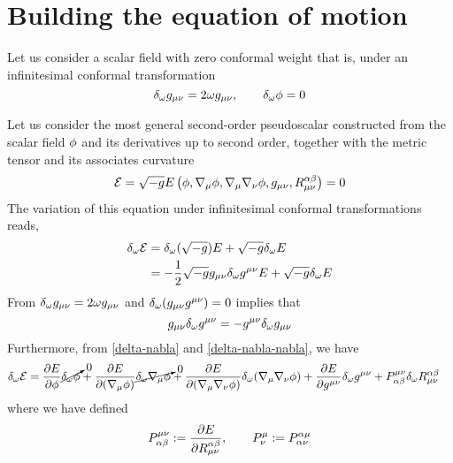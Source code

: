 \section{Building the equation of motion}
Let us consider a scalar field with zero conformal weight that is, under an infinitesimal conformal transformation
\begin{equation}
  \delta_\omega g_{\mu\nu }=2\omega g_{\mu\nu },\qquad \delta_\omega\phi=0
\end{equation}

Let us consider the most general second-order pseudoscalar constructed from the scalar field $\phi$ and its derivatives up to second order, together with the metric tensor and its associates curvature
\begin{equation}
	\mathcal{E} =\sqrt{-g}E\left(\phi,\nabla_\mu \phi ,\nabla_\mu \nabla_\nu \phi ,g_{\mu\nu },R_{\mu\nu }^{\alpha\beta }\right)=0
\end{equation}
The variation of this equation under infinitesimal conformal transformations reads,
\begin{align}
  \delta_\omega \mathcal{E}&=\delta_\omega(\sqrt{-g})E+\sqrt{-g}\delta_\omega E\\
  &=-\frac{1}{2}\sqrt{-g}g_{\mu\nu }\delta_\omega g^{\mu\nu }E+\sqrt{-g}\delta_\omega E
\end{align}
From $\delta_\omega g_{\mu\nu }=2\omega g_{\mu\nu }$ and $\delta_\omega(g_{\mu\nu }g^{\mu\nu })=0$ implies that
\begin{equation}
  g_{\mu\nu }\delta_\omega g^{\mu\nu }=-g^{\mu\nu }\delta_\omega g_{\mu\nu }
\end{equation}
Furthermore, from \eqref{delta-nabla} and \eqref{delta-nabla-nabla}, we have
\begin{align}
  \delta_\omega \mathcal{E}&=\pdv{E}{\phi}\cancelto{0}{\delta_\omega \phi} +\pdv{E}{(\nabla_\mu\phi)}\cancelto{0}{\delta_\omega \nabla_\mu \phi} +\pdv{E}{(\nabla_\mu\nabla_\nu\phi)}\delta_\omega (\nabla_\mu \nabla_\nu \phi )+\pdv{E}{g^{\mu\nu}}\delta_\omega g^{\mu\nu }+P^{\mu\nu }_{\alpha\beta }\delta_\omega R^{\alpha\beta }_{\mu\nu }
\end{align}
where we have defined 
\begin{equation}\label{P-trnsor}
  P^{\mu\nu }_{\alpha\beta }:=\pdv{E}{R_{\mu\nu}^{\alpha\beta}},\qquad   P^\mu_\nu :=P^{\alpha\mu }_{\alpha\nu }
\end{equation}

